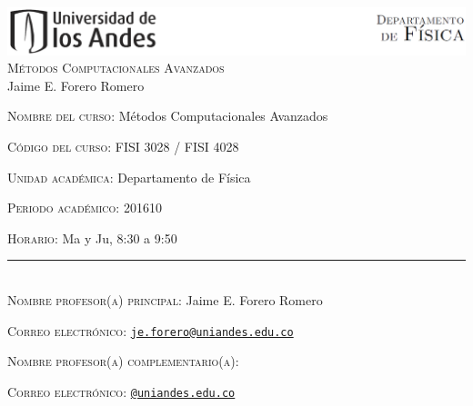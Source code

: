 \documentclass[letterpaper,10pt,onecolumn]{article}
\begin{document}
\begin{center}

\includegraphics[width=490pt]{header.png}\\[0.5cm]

\textsc{\LARGE M\'etodos Computacionales Avanzados}\\[0.1cm]

\large Jaime E. Forero Romero\\[0.5cm]

\end{center}

\large \noindent\textsc{Nombre del curso:}  M\'etodos Computacionales
Avanzados%
  
\noindent\textsc{C\'odigo del curso:} FISI 3028 / FISI 4028 %

\noindent\textsc{Unidad acad\'emica:} Departamento de F\'isica

\noindent\textsc{Periodo acad\'emico:} 201610 %

\noindent\textsc{Horario:} Ma y Ju, 8:30 a 9:50 %

\noindent\rule{\textwidth}{1pt}\\[-0.3cm]

\normalsize \noindent\textsc{Nombre profesor(a) principal:} Jaime
E. Forero Romero%

\noindent\textsc{Correo electr\'onico:}
\href{mailto:je.forero@uniandes.edu.co}{\nolinkurl{je.forero@uniandes.edu.co}}


\noindent\textsc{Nombre profesor(a) complementario(a):} %

\noindent\textsc{Correo electr\'onico:}
\href{mailto:@uniandes.edu.co}{\nolinkurl{@uniandes.edu.co}}
\end{document}
